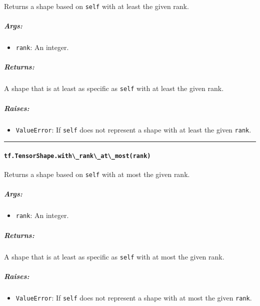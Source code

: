 Returns a shape based on \lstinline{self} with at least the given rank.

\subparagraph{Args: }\label{args-34}

\begin{itemize}
\tightlist
\item
  \lstinline{rank}: An integer.
\end{itemize}

\subparagraph{Returns: }\label{returns-35}

A shape that is at least as specific as \lstinline{self} with at least the
given rank.

\subparagraph{Raises: }\label{raises-19}

\begin{itemize}
\tightlist
\item
  \lstinline{ValueError}: If \lstinline{self} does not represent a shape with
  at least the given \lstinline{rank}.
\end{itemize}

\begin{center}\rule{0.5\linewidth}{\linethickness}\end{center}

\paragraph{\texorpdfstring{\lstinline{tf.TensorShape.with\_rank\_at\_most(rank)}
}{tf.TensorShape.with\_rank\_at\_most(rank) }}\label{tf.tensorshape.withux5frankux5fatux5fmostrank}

Returns a shape based on \lstinline{self} with at most the given rank.

\subparagraph{Args: }\label{args-35}

\begin{itemize}
\tightlist
\item
  \lstinline{rank}: An integer.
\end{itemize}

\subparagraph{Returns: }\label{returns-36}

A shape that is at least as specific as \lstinline{self} with at most the
given rank.

\subparagraph{Raises: }\label{raises-20}

\begin{itemize}
\tightlist
\item
  \lstinline{ValueError}: If \lstinline{self} does not represent a shape with
  at most the given \lstinline{rank}.
\end{itemize}

